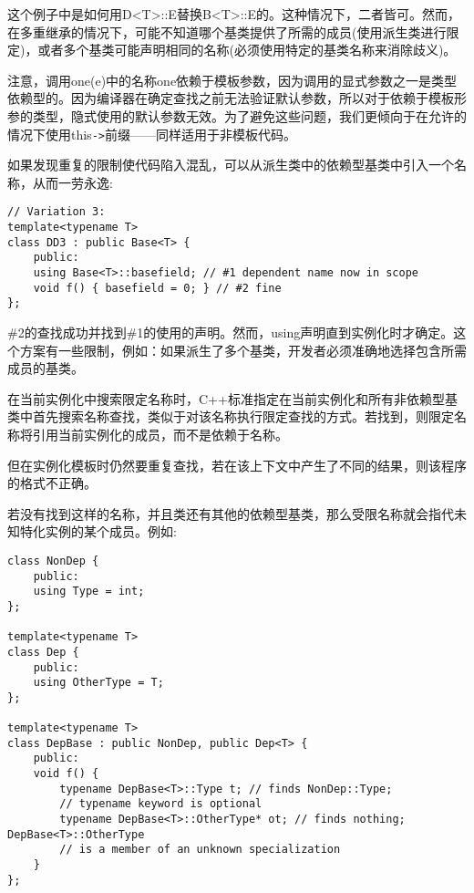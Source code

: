 这个例子中是如何用D<T>::E替换B<T>::E的。这种情况下，二者皆可。然而，在多重继承的情况下，可能不知道哪个基类提供了所需的成员(使用派生类进行限定)，或者多个基类可能声明相同的名称(必须使用特定的基类名称来消除歧义)。

注意，调用one(e)中的名称one依赖于模板参数，因为调用的显式参数之一是类型依赖型的。因为编译器在确定查找之前无法验证默认参数，所以对于依赖于模板形参的类型，隐式使用的默认参数无效。为了避免这些问题，我们更倾向于在允许的情况下使用this\texttt{->}前缀——同样适用于非模板代码。

如果发现重复的限制使代码陷入混乱，可以从派生类中的依赖型基类中引入一个名称，从而一劳永逸:

\begin{lstlisting}[style=styleCXX]
// Variation 3:
template<typename T>
class DD3 : public Base<T> {
	public:
	using Base<T>::basefield; // #1 dependent name now in scope
	void f() { basefield = 0; } // #2 fine
};
\end{lstlisting}

\#2的查找成功并找到\#1的使用的声明。然而，using声明直到实例化时才确定。这个方案有一些限制，例如：如果派生了多个基类，开发者必须准确地选择包含所需成员的基类。

在当前实例化中搜索限定名称时，C++标准指定在当前实例化和所有非依赖型基类中首先搜索名称查找，类似于对该名称执行限定查找的方式。若找到，则限定名称将引用当前实例化的成员，而不是依赖于名称。

\begin{tcolorbox}[colback=webgreen!5!white,colframe=webgreen!75!black]
\hspace*{0.75cm}但在实例化模板时仍然要重复查找，若在该上下文中产生了不同的结果，则该程序的格式不正确。
\end{tcolorbox}

若没有找到这样的名称，并且类还有其他的依赖型基类，那么受限名称就会指代未知特化实例的某个成员。例如:

\begin{lstlisting}[style=styleCXX]
class NonDep {
	public:
	using Type = int;
};

template<typename T>
class Dep {
	public:
	using OtherType = T;
};

template<typename T>
class DepBase : public NonDep, public Dep<T> {
	public:
	void f() {
		typename DepBase<T>::Type t; // finds NonDep::Type;
		// typename keyword is optional
		typename DepBase<T>::OtherType* ot; // finds nothing; DepBase<T>::OtherType
		// is a member of an unknown specialization
	}
};
\end{lstlisting}























